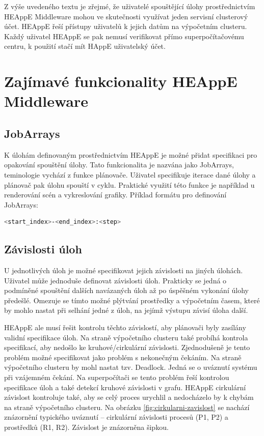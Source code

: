 Z výše uvedeného textu je zřejmé, že uživatelé spouštějící úlohy prostřednictvím HEAppE Middleware mohou ve skutečnosti využívat jeden servisní clusterový účet. HEAppE řeší přístupy uživatelů k jejich datům na výpočetním clusteru. Každý uživatel HEAppE se pak nemusí verifikovat přímo superpočítačovému centru, k použití stačí mít HAppE uživatelský účet.

\section{Zajímavé funkcionality HEAppE Middleware}
\subsection{JobArrays}
K úlohám definovaným prostřednictvím HEAppE je možné přidat specifikaci pro opakování spouštění úlohy. Tato funkcionalita je nazvána jako JobArrays, teminologie vychází z funkce plánovače. Uživatel specifikuje iterace dané úlohy a plánovač pak úlohu spouští v cyklu. Praktické využití této funkce je například u renderování scén a vykreslování grafiky.
Příklad formátu pro definování JobArrays:


\begin{lstlisting}[language=bash,caption={Struktura definice JobArrays}]
                            <start_index>-<end_index>:<step>
\end{lstlisting}

\subsection{Závislosti úloh}
U jednotlivých úloh je možné specifikovat jejich závislosti na jiných úlohách. Uživatel může jednoduše definovat závislosti úloh. Prakticky se jedná o podmíněné spouštění dalších navázaných úloh až po úspěšném vykonání úlohy předešlé. Omezuje se tímto možné plýtvání prostředky a výpočetním časem, které by mohlo nastat při selhání jedné z úloh, na jejímž výstupu závisí úloha další.

HEAppE ale musí řešit kontrolu těchto závislostí, aby plánovači byly zasílány validní specifikace úloh. Na straně výpočetního clusteru také probíhá kontrola specifikací, aby nedošlo ke kruhové/cirkulární závislosti. Zjednodušeně je tento problém možné specifikovat jako problém s nekonečným čekáním. Na straně výpočetního clusteru by mohl nastat tzv. Deadlock. Jedná se o uváznutí systému při vzájemném čekání. Na superpočítači se tento problém řeší kontrolou specifikace úloh a také detekcí kruhové závislosti v grafu. HEAppE cirkulární závislost kontroluje také, aby se celý proces urychlil a nedocházelo by k chybám na straně výpočetního clusteru. Na obrázku \ref{fig:cirkularni-zavislost} se nachází znázornění typického uváznutí – cirkulární závislosti procesů (P1, P2) a prostředků (R1, R2). Závislost je znázorněna šipkou.


